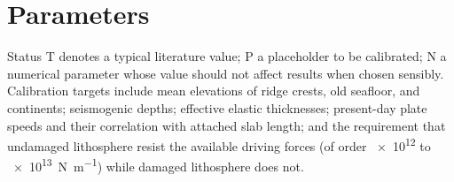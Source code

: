 \documentclass[11pt]{article}
\begin{document}
\section{Parameters}

Status \textsf{T} denotes a typical literature value; \textsf{P} a placeholder
to be calibrated; \textsf{N} a numerical parameter whose value should not affect
results when chosen sensibly. Calibration targets include mean elevations of
ridge crests, old seafloor, and continents; seismogenic depths; effective
elastic thicknesses; present-day plate speeds and their correlation with
attached slab length; and the requirement that undamaged lithosphere resist the
available driving forces (of order \SI{e12}{} to \SI{e13}{\newton\per\metre})
while damaged lithosphere does not.
\end{document}
